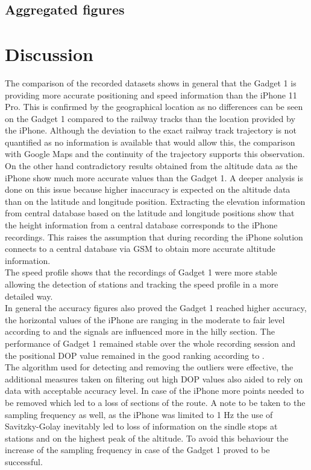 \documentclass{article}
\begin{document}
		\subsection{Aggregated figures}
	\section{Discussion}
		The comparison of the recorded datasets shows in general that the Gadget 1 is providing more accurate positioning and speed information than the iPhone 11 Pro. This is confirmed by the geographical location as no differences can be seen on the Gadget 1 compared to the railway tracks than the location provided by the iPhone. Although the deviation to the exact railway track trajectory is not quantified as no information is available that would allow this, the comparison with Google Maps and the continuity of the trajectory supports this observation. \\
		On the other hand contradictory results obtained from the altitude data as the iPhone show much more accurate values than the Gadget 1. A deeper analysis is done on this issue because higher inaccuracy is expected on the altitude data than on the latitude and longitude position. Extracting the elevation information from central database based on the latitude and longitude positions show that the height information from a central database \cite{GPSVisualizerAssign} corresponds to the iPhone recordings. This raises the assumption that during recording the iPhone solution connects to a central database via GSM to obtain more accurate altitude information. \\ 
		The speed profile shows that the recordings of Gadget 1 were more stable allowing the detection of stations and tracking the speed profile in a more detailed way. \\
		In general the accuracy figures also proved the Gadget 1 reached higher accuracy, the horizontal values of the iPhone are ranging in the moderate to fair level according to \cite{tahsinAnalysisDOPIts2015} and the signals are influenced more in the hilly section. The performance of Gadget 1 remained stable over the whole recording session and the positional DOP value remained in the good ranking according to \cite{tahsinAnalysisDOPIts2015}. \\
		The algorithm used for detecting and removing the outliers were effective, the additional measures taken on filtering out high DOP values also aided to rely on data with acceptable accuracy level. In case of the iPhone more points needed to be removed which led to a loss of sections of the route. A note to be taken to the sampling frequency as well, as the iPhone was limited to 1 Hz the use of Savitzky-Golay inevitably led to loss of information on the sindle stops at stations and on the highest peak of the altitude. To avoid this behaviour the increase of the sampling frequency in case of the Gadget 1 proved to be successful.
\end{document}
